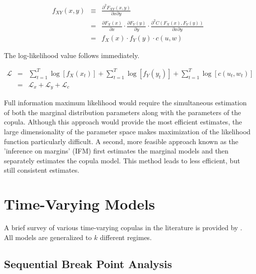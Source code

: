\documentclass[12pt]{article}
\newcommand{\Lagr}{\mathcal{L}}
\begin{document}
\begin{eqnarray*}
f_{XY}\left(x,y\right) &\equiv& \frac{\partial^{2}F_{XY}\left(x,y\right)}{\partial x \partial y} \\
    &=& \frac{\partial F_{X}\left(x\right)}{\partial x} \cdot \frac{\partial F_{Y}\left(y\right)}{\partial y} \cdot \frac{\partial^{2}C\left(F_{X}\left(x\right), F_{Y}\left(y\right)\right)}{\partial x\partial y} \\
    &=& f_{X}\left(x\right) \cdot f_{Y}\left(y\right) \cdot c\left(u,w\right)
\end{eqnarray*}

The log-likelihood value follows immediately.

\begin{eqnarray*}
\Lagr &=& \sum\nolimits_{t=1}^{T}\log \left[f_{X}\left(x_{t}\right)\right] + \sum\nolimits_{t=1}^{T}\log \left[f_{Y}\left(y_{t}\right)\right]
+ \sum\nolimits_{t=1}^{T}\log \left[c\left(u_{t}, w_{t}\right)\right] \\
    &=& \Lagr_{x} + \Lagr_{y} + \Lagr_{c}
\end{eqnarray*}

Full information maximum likelihood would require the simultaneous estimation of both the marginal distribution parameters along with the parameters of the copula. Although this approach would provide the most efficient estimates, the large dimensionality of the parameter space makes maximization of the likelihood function particularly difficult. A second, more feasible approach known as the 'inference on margins' (IFM) first estimates the marginal models and then separately estimates the copula model. This method leads to less efficient, but still consistent estimates.

\section{Time-Varying Models} \label{sec:time_varying_models}

A brief survey of various time-varying copulas in the literature is provided by \cite{Manner_and_Reznikova_2012}. All models are generalized to $k$ different regimes.

\subsection{Sequential Break Point Analysis}
\end{document}
